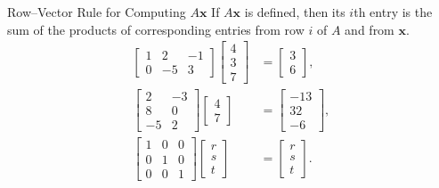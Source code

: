\begin{frame}{Row--Vector Rule for Computing $A\mathbf{x}$}
  If $A\mathbf{x}$ is defined, then its $i$th entry is the sum of the products
  of corresponding entries from row $i$ of $A$ and from $\mathbf{x}$.
  \begin{align*}
    \begin{bmatrix}1&2&-1\\0&-5&3\end{bmatrix}
      \begin{bmatrix}4\\3\\7\end{bmatrix}
      &=\begin{bmatrix}3\\6\end{bmatrix},\\
    \begin{bmatrix}2&-3\\8&0\\-5&2\end{bmatrix}
      \begin{bmatrix}4\\7\end{bmatrix}
      &=\begin{bmatrix}-13\\32\\-6\end{bmatrix},\\
    \begin{bmatrix}1&0&0\\0&1&0\\0&0&1\end{bmatrix}
      \begin{bmatrix}r\\s\\t\end{bmatrix}
      &=\begin{bmatrix}r\\s\\t\end{bmatrix}.
  \end{align*}
\end{frame}

